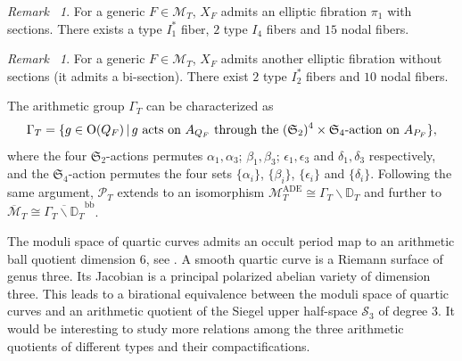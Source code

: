\documentclass[12pt,reqno,a4paper]{amsart}
\theoremstyle{remark}
\newtheorem{rmk}[thm]{Remark~}
\theoremstyle{definition}
\newcommand{\DD}{\mathbb{D}}
\newcommand{\Prd}{\mathscr{P}}
\newcommand{\calM}{\mathcal{M}}
\newcommand\Or{\mathrm{O}}
\newcommand{\bs}{\backslash}
\begin{document}
\begin{rmk}
    For a generic $F\in\calM_T$, $X_F$ admits an elliptic fibration $\pi_1$ with sections.
    There exists a type $I_1^*$ fiber, $2$ type $I_4$ fibers and $15$ nodal fibers.
\end{rmk}
\begin{rmk}
    For a generic $F\in\calM_T$, $X_F$ admits another elliptic fibration without sections (it admits a bi-section).
    There exist $2$ type $I_2^*$ fibers and $10$ nodal fibers.
\end{rmk}

The arithmetic group $\Gamma_{T}$ can be characterized as
\begin{equation*}
    \Gamma_{T} = \{ g\in\Or(Q_F) \,|\, g \textup{ acts on } A_{Q_F} \textup{ through the } (\mathfrak{S}_2)^4\times\mathfrak{S}_4\textup{-action on } A_{P_F} \},
\end{equation*}
where the four $\mathfrak{S}_2$-actions permutes $\alpha_1,\alpha_3$; $\beta_1,\beta_3$; $\epsilon_1,\epsilon_3$ and $\delta_1,\delta_3$ respectively, and the $\mathfrak{S}_4$-action permutes the four sets $\{\alpha_i\}$, $\{\beta_i\}$, $\{\epsilon_i\}$ and $\{\delta_i\}$.
Following the same argument, $\Prd_{T}$ extends to an isomorphism $\calM_{T}^{\mathrm{ADE}} \cong \Gamma_{T} \bs \DD_{T}$ and further to $\overline{\calM}_{T} \cong \overline{\Gamma_{T} \bs \DD_{T}}^{\mathrm{bb}}$.

The moduli space of quartic curves admits an occult period map to an arithmetic ball quotient dimension $6$, see \cite{kondo2011moduli}.
    A smooth quartic curve is a Riemann surface of genus three.
    Its Jacobian is a principal polarized abelian variety of dimension three. This leads to a birational equivalence between the moduli space of quartic curves and an arithmetic quotient of the Siegel upper half-space $\mathcal{S}_3$ of degree $3$.
    It would be interesting to study more relations among the three arithmetic quotients of different types and their compactifications.







\end{document}
